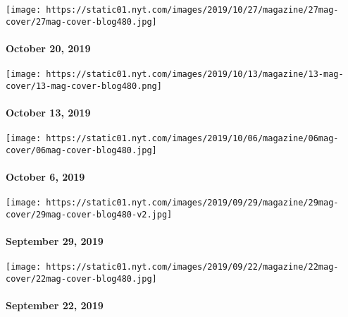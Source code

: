 \href{https://www.nytimes.com/issue/magazine/2019/10/18/the-102019-issue}{}

\texttt{[image: https://static01.nyt.com/images/2019/10/27/magazine/27mag-cover/27mag-cover-blog480.jpg]}

\hypertarget{october-20-2019}{%
\paragraph{October 20, 2019}\label{october-20-2019}}

\href{https://www.nytimes.com/issue/magazine/2019/10/11/the-101319-issue}{}

\texttt{[image: https://static01.nyt.com/images/2019/10/13/magazine/13-mag-cover/13-mag-cover-blog480.png]}

\hypertarget{october-13-2019}{%
\paragraph{October 13, 2019}\label{october-13-2019}}

\href{https://www.nytimes.com/issue/magazine/2019/10/04/the-10619-issue}{}

\texttt{[image: https://static01.nyt.com/images/2019/10/06/magazine/06mag-cover/06mag-cover-blog480.jpg]}

\hypertarget{october-6-2019}{%
\paragraph{October 6, 2019}\label{october-6-2019}}

\href{https://www.nytimes.com/interactive/2019/09/24/magazine/adventure-archive-photos.html}{}

\texttt{[image: https://static01.nyt.com/images/2019/09/29/magazine/29mag-cover/29mag-cover-blog480-v2.jpg]}

\hypertarget{september-29-2019}{%
\paragraph{September 29, 2019}\label{september-29-2019}}

\href{https://www.nytimes.com/issue/magazine/2019/09/20/the-92219-issue}{}

\texttt{[image: https://static01.nyt.com/images/2019/09/22/magazine/22mag-cover/22mag-cover-blog480.jpg]}

\hypertarget{september-22-2019}{%
\paragraph{September 22, 2019}\label{september-22-2019}}

